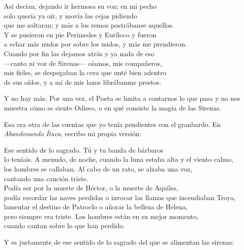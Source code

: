 \begin{versocita}
Así decían, dejando ir hermosa su voz; en mi pecho\\
solo quería ya oír, y movía las cejas pidiendo\\
que me soltaran; y más a los remos postrábanse aquellos.\\
Y se pusieron en pie Perimedes y Euríloco y fueron\\
a echar más nudos por sobre los nudos, y más me prendieron.\\
Cuando por fin las dejamos atrás y ya nada de eso\\
---canto ni voz de Sirenas--- oíamos, mis compañeros,\\
mis fieles, se despegaban la cera que unté bien adentro\\
de sus oídos, y a mí de mis lazos librábanme prestos.
\end{versocita}

Y no hay más. Por una vez, el Poeta se limita a contarnos lo que pasa y no nos muestra cómo se siente Odiseo, o en qué consiste la magia de las Sirenas.

Esa era otra de las cuentas que yo tenía pendientes con el granbardo. En \emph{Abandonando Ítaca}, escribo mi propia versión:

\begin{versopropio}
Ese sentido de lo sagrado. Tú y tu banda de bárbaros\\
lo teníais. A menudo, de noche, cuando la luna estaba alta y el viento calmo,\\
los hombres se callaban. Al cabo de un rato, se alzaba una voz,\\
cantando una canción triste.\\
Podía ser por la muerte de Héctor, o la muerte de Aquiles,\\
podía recordar las naves perdidas o invocar las llamas que incendiaban Troya,\\
lamentar el destino de Patroclo o añorar la belleza de Helena,\\
pero siempre era triste. Los hombres están en su mejor momento,\\
cuando cantan sobre lo que han perdido.
\end{versopropio}

Y es justamente de ese sentido de lo sagrado del que se alimentan las sirenas:

